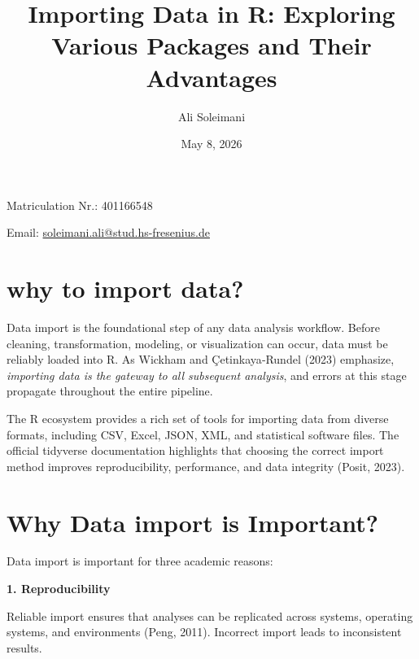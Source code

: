 \documentclass[
  doc,
  longtable,
  a4paper,
  nolmodern,
  notxfonts,
  notimes,
  colorlinks=true,linkcolor=blue,citecolor=blue,urlcolor=blue]{apa7}
\title{Importing Data in R: Exploring Various Packages and Their
Advantages}
\author{Ali Soleimani}
\affiliation{
{Fresenius University of Applied Science}}
\date{May 8, 2026}
\begin{document}
\maketitle



\setcounter{secnumdepth}{3}

\setlength\LTleft{0pt}



\ifdefined\Shaded\renewenvironment{Shaded}{\begin{snugshade}\begin{singlespace}}{\end{singlespace}\end{snugshade}}\fi

\setlength{\cslhangindent}{0.5in}

Matriculation Nr.: 401166548

Email:
\href{mailto:Alisoleimani71@gmail.com}{soleimani.ali@stud.hs-fresenius.de}

\section{why to import data?}\label{why-to-import-data}

Data import is the foundational step of any data analysis workflow.
Before cleaning, transformation, modeling, or visualization can occur,
data must be reliably loaded into R. As Wickham and Çetinkaya‑Rundel
(2023) emphasize, \emph{importing data is the gateway to all subsequent
analysis}, and errors at this stage propagate throughout the entire
pipeline.

The R ecosystem provides a rich set of tools for importing data from
diverse formats, including CSV, Excel, JSON, XML, and statistical
software files. The official tidyverse documentation highlights that
choosing the correct import method improves reproducibility,
performance, and data integrity (Posit, 2023).

\section{Why Data import is
Important?}\label{why-data-import-is-important}

Data import is important for three academic reasons:

\textbf{1. Reproducibility}

Reliable import ensures that analyses can be replicated across systems,
operating systems, and environments (Peng, 2011). Incorrect import leads
to inconsistent results.
\end{document}

